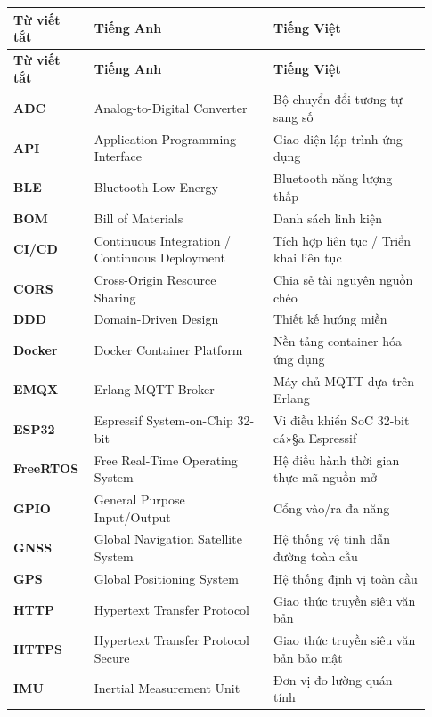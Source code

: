\documentclass[a4paper]{extarticle}
\newcounter{none} %
\begin{document}
{\def\LTcaptype{none} %
\setlength{\tabcolsep}{4pt}
\begin{longtable}{|L{0.160\linewidth}|L{0.410\linewidth}|L{0.360\linewidth}|}
\hline
\textbf{Từ viết tắt} & \textbf{Tiếng Anh} & \textbf{Tiếng Việt} \\
\hline
\endfirsthead
\hline
\textbf{Từ viết tắt} & \textbf{Tiếng Anh} & \textbf{Tiếng Việt} \\
\hline
\endhead
\hline
\endfoot
\endlastfoot
\textbf{ADC} & Analog-to-Digital Converter & Bộ chuyển đổi tương tự sang
số \\\hline
\textbf{API} & Application Programming Interface & Giao diện lập trình
ứng dụng \\\hline
\textbf{BLE} & Bluetooth Low Energy & Bluetooth năng lượng thấp \\\hline
\textbf{BOM} & Bill of Materials & Danh sách linh kiện \\\hline
\textbf{CI/CD} & Continuous Integration / Continuous Deployment & Tích
hợp liên tục / Triển khai liên tục \\\hline
\textbf{CORS} & Cross-Origin Resource Sharing & Chia sẻ tài nguyên nguồn
chéo \\\hline
\textbf{DDD} & Domain-Driven Design & Thiết kế hướng miền \\\hline
\textbf{Docker} & Docker Container Platform & Nền tảng container hóa ứng
dụng \\\hline
\textbf{EMQX} & Erlang MQTT Broker & Máy chủ MQTT dựa trên Erlang \\\hline
\textbf{ESP32} & Espressif System-on-Chip 32-bit & Vi điều khiển SoC
32-bit cá»§a Espressif \\\hline
\textbf{FreeRTOS} & Free Real-Time Operating System & Hệ điều hành thời
gian thực mã nguồn mở \\\hline
\textbf{GPIO} & General Purpose Input/Output & Cổng vào/ra đa năng \\\hline
\textbf{GNSS} & Global Navigation Satellite System & Hệ thống vệ tinh
dẫn đường toàn cầu \\\hline
\textbf{GPS} & Global Positioning System & Hệ thống định vị toàn cầu \\\hline
\textbf{HTTP} & Hypertext Transfer Protocol & Giao thức truyền siêu văn
bản \\\hline
\textbf{HTTPS} & Hypertext Transfer Protocol Secure & Giao thức truyền
siêu văn bản bảo mật \\\hline
\textbf{IMU} & Inertial Measurement Unit & Đơn vị đo lường quán tính \\\hline

\end{longtable}}
\end{document}
